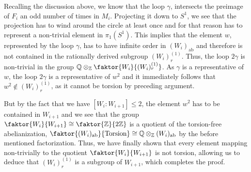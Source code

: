 
Recalling the discussion above, we know that the loop \(\gamma\), intersects the preimage of \(F_i\) an odd number of times in \(M_i\).
Projecting it down to \(S^1\), we see that the projection has to wind around the circle at least once and for that reason has to represent a non-trivial element in \(\pi_1(S^1)\).
This implies that the element \(w\), represented by the loop \(\gamma\), has to have infinite order in \((W_i)_\text{ab}\) and therefore is not contained in the rationally derived subgroup \((W_i)_r^{(1)}\). %
Thus, the loop \(2\gamma\) is non-trivial in the group \(\Q \otimes_\Z \faktor{W_i}{(W_i)_r^{(1)}}\). %
As \(\gamma\) is a representative of \(w\), the loop \(2\gamma\) is a representative of \(w^2\) and it immediately follows that \(w^2 \notin (W_i)_r^{(1)}\), as it cannot be torsion by preceding argument.

But by the fact that we have \([W_i: W_{i+1}] \leq 2\), the element \(w^2\) has to be contained in \(W_{i+1}\) and we see that the group \(\faktor{W_i}{W_{i+1}} \cong \faktor{\Z}{2\Z}\) is a quotient of the torsion-free abelianization, \(\faktor{(W_i)_{\text{ab}}}{\text{Torsion}} \cong \Q \otimes_\Z (W_i)_{\text{ab}}\) by the before mentioned factorization.
Thus, we have finally shown that every element mapping non-trivially to the quotient \(\faktor{W_i}{W_{i+1}}\) is not torsion, allowing us to deduce that \((W_i)_r^{(1)}\) is a subgroup of \(W_{i+1}\), which completes the proof.
